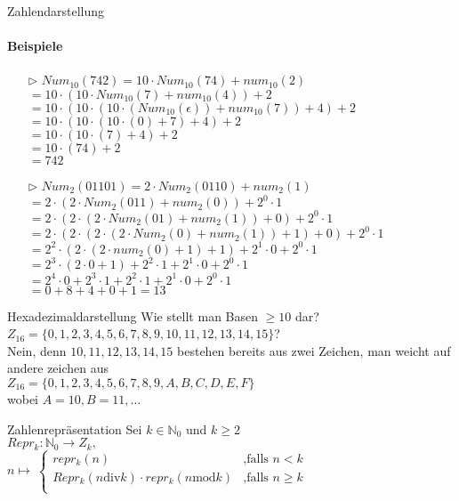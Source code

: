 \begin{frame}{Zahlendarstellung}
 \framesubtitle{Beispiele}
 \begin{enumerate}
  \item[$\triangleright$] $Num_{10}(742)=10\cdot Num_{10}(74)+num_{10}(2)$\\
        $=10\cdot(10\cdot Num_{10}(7)+num_{10}(4))+2$\\
        $=10\cdot(10\cdot(10\cdot (Num_{10}(\epsilon))+num_{10}(7))+4)+2$\\%
        $=10\cdot(10\cdot(10\cdot (0)+7)+4)+2$\\
        $=10\cdot(10\cdot(7)+4)+2$\\
        $=10\cdot(74)+2$\\
        $=742$\\
  \item[$\triangleright$] $Num_{2}(01101)=2\cdot Num_{2}(0110)+num_{2}(1)$\\
        $=2\cdot(2\cdot Num_{2}(011)+num_{2}(0))+2^{0}\cdot1$\\
        $=2\cdot(2\cdot (2\cdot Num_{2}(01)+num_{2}(1))+0)+2^{0}\cdot1$\\
        $=2\cdot(2\cdot (2\cdot (2\cdot Num_{2}(0)+num_{2}(1))+1)+0)+2^{0}\cdot1$\\
        $=2^{2}\cdot (2\cdot (2\cdot num_{2}(0)+1)+1)+2^{1}\cdot0+2^{0}\cdot1$\\
        $=2^{3}\cdot (2\cdot 0+1)+2^{2}\cdot1+2^{1}\cdot0+2^{0}\cdot1$\\
        $=2^{4}\cdot 0+2^{3}\cdot 1+2^{2}\cdot1+2^{1}\cdot0+2^{0}\cdot1$\\
        $=0+8+4+0+1=13$
 \end{enumerate}
\end{frame}

\begin{frame}{Hexadezimaldarstellung}
 Wie stellt man Basen $\geq10$ dar?\\
 $Z_{16}=\{0,1,2,3,4,5,6,7,8,9,10,11,12,13,14,15\}$?\\
 Nein, denn $10,11,12,13,14,15$ bestehen bereits aus zwei Zeichen, man weicht auf andere zeichen aus\\
 $Z_{16}=\{0,1,2,3,4,5,6,7,8,9,A,B,C,D,E,F\}$\\
 wobei $A=10,B=11,\dots$\\
\end{frame}

\begin{frame}{Zahlenrepräsentation}
 Sei $k\in\mathbb{N}_{0}$ und $k\geq2$\\
 $Repr_{k}:\mathbb{N}_{0}\longrightarrow Z_{k},$\\
 $n\mapsto~
  \begin{cases}
   repr_{k}(n)                                        & \text{,falls $n<k$}     \\
   Repr_{k}(n\text{div}k)\cdot repr_{k}(n\text{mod}k) & \text{,falls $n\geq k$} \\
  \end{cases}$\\
 \\
\end{frame}


